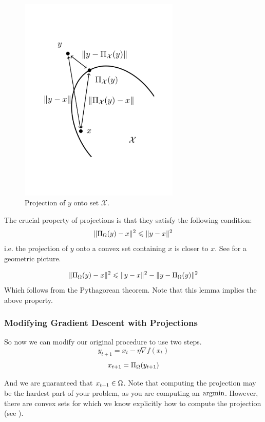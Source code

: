 \begin{figure}
\begin{center}
\includegraphics[width=3in]{figures/lecture2-projection}
\end{center}
\caption{Projection of $y$ onto set $\mathcal{X}$. }
\end{figure}

The crucial property of projections is that they satisfy the following condition:
\[
\| \Pi_{\Omega}(y) - x \|^2 \leqslant \| y - x \|^2
\]
i.e. the projection of $y$ onto a convex set containing $x$ is closer to $x$. See  for a geometric picture.

\begin{lemma}
\[
\| \Pi_{\Omega}(y) - x \|^2 \leqslant \| y - x \|^2 - \| y - \Pi_{\Omega}(y) \|^2
\]
Which follows from the Pythagorean theorem. Note that this lemma implies the above property.
\end{lemma}

\subsubsection{Modifying Gradient Descent with Projections}

So now we can modify our original procedure to use two steps.
\[
y_{t+1} = x_t - \eta \nabla f(x_t)
\]
\[
x_{t+1} = \Pi_{\Omega}(y_{t+1})
\]

And we are guaranteed that $x_{t+1}\in\Omega$. Note that computing the projection may be the hardest part of your problem, as you are computing an $\operatorname*{\arg\!\min}$. However, there are convex sets for which we know explicitly how to compute the projection (see ).


